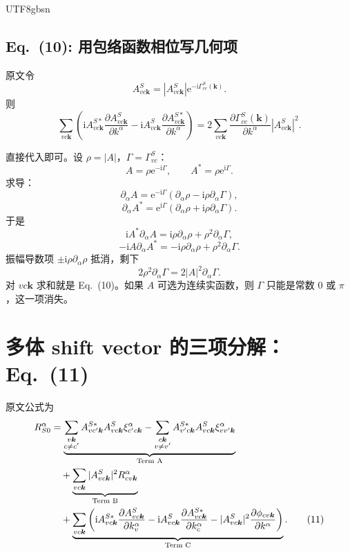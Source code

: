 \documentclass[11pt,a4paper]{article}
\newcommand{\ii}{\mathrm{i}}
\newcommand{\ee}{\mathrm{e}}
\begin{document}
\begin{CJK}{UTF8}{gbsn}
\subsection*{Eq.~(10): 用包络函数相位写几何项}

原文令
\[
A^S_{vc\bm k}=|A^S_{vc\bm k}|\ee^{-\ii\Gamma^S_{vc}(\bm k)}.
\]
则
\begin{equation}
\sum_{vc\bm k}
\left(
\ii A^{S*}_{vc\bm k}
\frac{\partial A^S_{vc\bm k}}{\partial k^\alpha}
-\ii A^S_{vc\bm k}
\frac{\partial A^{S*}_{vc\bm k}}{\partial k^\alpha}
\right)
=
2\sum_{vc\bm k}
\frac{\partial\Gamma^S_{vc}(\bm k)}{\partial k^\alpha}
\left|A^S_{vc\bm k}\right|^2 .
\tag{10}
\end{equation}

直接代入即可。设 $\rho=|A|$，$\Gamma=\Gamma^S_{vc}$：
\[
A=\rho\ee^{-\ii\Gamma},\qquad
A^*=\rho\ee^{\ii\Gamma}.
\]
求导：
\[
\partial_\alpha A
=\ee^{-\ii\Gamma}
\left(\partial_\alpha\rho-\ii\rho\partial_\alpha\Gamma\right),
\]
\[
\partial_\alpha A^*
=\ee^{\ii\Gamma}
\left(\partial_\alpha\rho+\ii\rho\partial_\alpha\Gamma\right).
\]
于是
\[
\ii A^*\partial_\alpha A
=\ii\rho\partial_\alpha\rho
+\rho^2\partial_\alpha\Gamma,
\]
\[
-\ii A\partial_\alpha A^*
=-\ii\rho\partial_\alpha\rho
+\rho^2\partial_\alpha\Gamma.
\]
振幅导数项 $\pm\ii\rho\partial_\alpha\rho$ 抵消，剩下
\[
2\rho^2\partial_\alpha\Gamma
=2|A|^2\partial_\alpha\Gamma.
\]
对 $vc\bm k$ 求和就是 Eq.~(10)。如果 $A$ 可选为连续实函数，则 $\Gamma$ 只能是常数 $0$ 或 $\pi$，这一项消失。

\section{多体 shift vector 的三项分解：Eq.~(11)}

原文公式为
\begin{align}
R^\alpha_{S0}
&=
\underbrace{
\sum_{\substack{v\bm k\\ c\ne c'}}
A^{S*}_{vc'\bm k}A^S_{vc\bm k}\xi^\alpha_{c'c\bm k}
-
\sum_{\substack{c\bm k\\ v\ne v'}}
A^{S*}_{v'c\bm k}A^S_{vc\bm k}\xi^\alpha_{vv'\bm k}
}_{\text{Term A}}
\notag\\
&\quad+
\underbrace{
\sum_{vc\bm k}
|A^S_{vc\bm k}|^2R^\alpha_{cv\bm k}
}_{\text{Term B}}
\notag\\
&\quad+
\underbrace{
\sum_{vc\bm k}
\left(
\ii A^{S*}_{vc\bm k}\frac{\partial A^S_{vc\bm k}}{\partial k^\alpha_v}
-\ii A^S_{vc\bm k}\frac{\partial A^{S*}_{vc\bm k}}{\partial k^\alpha_c}
-|A^S_{vc\bm k}|^2
\frac{\partial\phi_{cv\bm k}}{\partial k^\alpha}
\right)
}_{\text{Term C}} .
\tag{11}
\end{align}


\end{CJK}
\end{document}
